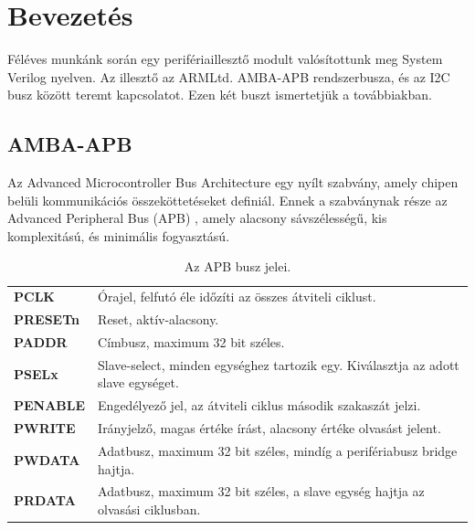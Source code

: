 \chapter{Bevezetés}
\label{sec:intro}

Féléves munkánk során egy perifériaillesztő modult valósítottunk meg System Verilog nyelven. Az illesztő az ARM\texttrademark Ltd. AMBA\texttrademark-APB rendszerbusza, és az I2C busz között teremt kapcsolatot. Ezen két buszt ismertetjük a továbbiakban.

\section{AMBA-APB}{
    Az Advanced Microcontroller Bus Architecture egy nyílt szabvány, amely chipen belüli kommunikációs összeköttetéseket definiál. Ennek a szabványnak része az Advanced Peripheral Bus (APB)\cite{APB} , amely alacsony sávszélességű, kis komplexitású, és minimális fogyasztású.

    \begin{table}[ht!]
        \begin{tabular}{l|p{}}
            \textbf{PCLK}       & Órajel, felfutó éle időzíti az összes átviteli ciklust. \\[3ex]
            \textbf{PRESETn}    & Reset, aktív-alacsony. \\[3ex]
            \textbf{PADDR}      & Címbusz, maximum 32 bit széles. \\[3ex]
            \textbf{PSELx}      & Slave-select, minden egységhez tartozik egy. Kiválasztja az adott slave egységet. \\[3ex]
            \textbf{PENABLE}    & Engedélyező jel, az átviteli ciklus második szakaszát jelzi. \\[3ex]
            \textbf{PWRITE}     & Irányjelző, magas értéke írást, alacsony értéke olvasást jelent. \\[3ex]
            \textbf{PWDATA}     & Adatbusz, maximum 32 bit széles, mindíg a perifériabusz bridge hajtja. \\[3ex]
            \textbf{PRDATA}     & Adatbusz, maximum 32 bit széles, a slave egység hajtja az olvasási ciklusban.
        \end{tabular}
        \caption{Az APB busz jelei.}
        \label{tab:APBsig}
    \end{table}

}
